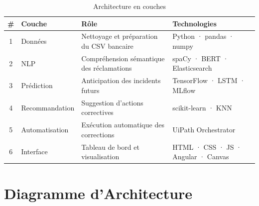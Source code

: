 \documentclass[12pt,a4paper]{report}
\begin{document}
\begin{table}[H]
\centering
\caption{Architecture en couches}
\begin{tabularx}{\textwidth}{|c|l|X|l|}
\hline
\textbf{\#} & \textbf{Couche} & \textbf{Rôle} & \textbf{Technologies} \\
\hline
1 & Données & Nettoyage et préparation du CSV bancaire & Python · pandas · numpy \\
\hline
2 & NLP & Compréhension sémantique des réclamations & spaCy · BERT · Elasticsearch \\
\hline
3 & Prédiction & Anticipation des incidents futurs & TensorFlow · LSTM · MLflow \\
\hline
4 & Recommandation & Suggestion d'actions correctives & scikit-learn · KNN \\
\hline
5 & Automatisation & Exécution automatique des corrections & UiPath Orchestrator \\
\hline
6 & Interface & Tableau de bord et visualisation & HTML · CSS · JS · Angular · Canvas \\
\hline
\end{tabularx}
\end{table}

\section{Diagramme d'Architecture}
\end{document}
